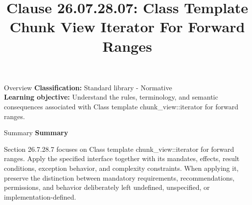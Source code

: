 \documentclass[10pt,letterpaper]{article}
\title{Clause 26.07.28.07: Class Template Chunk View Iterator For Forward Ranges}
\author{}
\date{}
\begin{document}
\maketitle
\begin{CornellOverviewBox}{Overview}
\textbf{Classification:} Standard library - Normative\\[2pt]
\textbf{Learning objective:} Understand the rules, terminology, and semantic consequences associated with Class template chunk\_view::iterator for forward ranges.
\end{CornellOverviewBox}\begin{CornellSummaryBox}{Summary}
{\sffamily\bfseries\color{Accent} Summary}\par\vspace{3pt}Section 26.7.28.7 focuses on Class template chunk\_view::iterator for forward ranges. Apply the specified interface together with its mandates, effects, result conditions, exception behavior, and complexity constraints. When applying it, preserve the distinction between mandatory requirements, recommendations, permissions, and behavior deliberately left undefined, unspecified, or implementation-defined.
\end{CornellSummaryBox}
\end{document}
